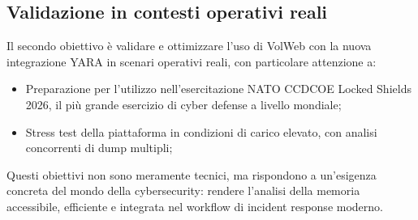 \subsection{Validazione in contesti operativi reali}

Il secondo obiettivo è validare e ottimizzare l’uso di VolWeb con la nuova integrazione YARA in scenari operativi reali, con particolare attenzione a:

\begin{itemize}
\item Preparazione per l’utilizzo nell’esercitazione NATO CCDCOE Locked Shields 2026, il più grande esercizio di cyber defense a livello mondiale;
\item Stress test della piattaforma in condizioni di carico elevato, con analisi concorrenti di dump multipli;
\end{itemize}

Questi obiettivi non sono meramente tecnici, ma rispondono a un'esigenza concreta del mondo della cybersecurity: rendere l'analisi della memoria accessibile, efficiente e integrata nel workflow di incident response moderno.